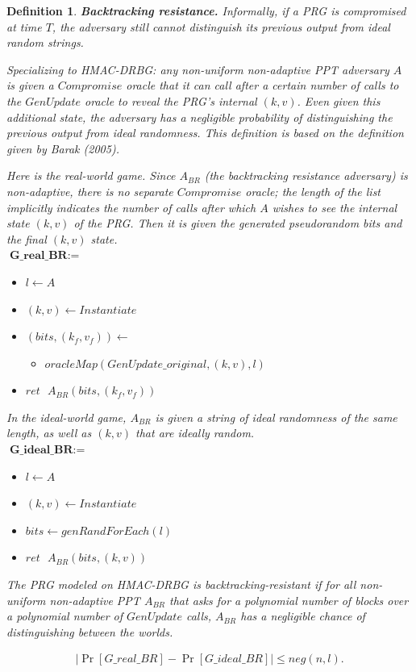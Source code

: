 \documentclass[12pt,lot, lof]{puthesis}
\newenvironment{game}
{ \begin{itemize}[noitemsep,nolistsep] 
}
{ \end{itemize}                  }
\newcommand{\s} {\textrm{ }}
\newcommand{\lar}{\leftarrow}
\newtheorem{dfn}[thm]{Definition}
\begin{document}
\begin{dfn} \textbf{Backtracking resistance.} Informally, if a PRG is compromised at time $T$, the adversary still cannot distinguish its previous output from ideal random strings. 

Specializing to HMAC-DRBG: any non-uniform non-adaptive PPT adversary $A$ is given a $Compromise$ oracle that it can call after a certain number of calls to the $GenUpdate$ oracle to reveal the PRG's internal $(k,v)$. Even given this additional state, the adversary has a negligible probability of distinguishing the previous output from ideal randomness. This definition is based on the definition given by Barak (2005).

Here is the real-world game. Since $A_{BR}$ (the backtracking resistance adversary) is non-adaptive, there is no separate $Compromise$ oracle; the length of the list implicitly indicates the number of calls after which $A$ wishes to see the internal state $(k,v)$ of the PRG. Then it is given the generated pseudorandom bits and the final $(k,v)$ state.\\

$\textbf{G\_real\_BR} := $
\begin{game}
\item[] $l \leftarrow A$
\item[] $(k,v) \leftarrow Instantiate$
\item[] $(bits, (k_f, v_f)) \lar$
  \begin{game}
    \item[] $oracleMap(GenUpdate\_original,(k, v),l)$
  \end{game}
\item[] $ret \s A_{BR}(bits, (k_f, v_f))$ \\
\end{game}

In the ideal-world game, $A_{BR}$ is given a string of ideal randomness of the same length, as well as $(k,v)$ that are ideally random.\\

$\textbf{G\_ideal\_BR} := $
\begin{game}
\item[] $l \leftarrow A$ 
\item[] $(k,v) \leftarrow Instantiate$
\item[] $bits \leftarrow genRandForEach(l)$
\item[] $ret \s A_{BR}(bits, (k,v))$ \\
\end{game}

The PRG modeled on HMAC-DRBG is backtracking-resistant if for all non-uniform non-adaptive PPT $A_{BR}$ that asks for a polynomial number of blocks over a polynomial number of $GenUpdate$ calls, $A_{BR}$ has a negligible chance of distinguishing between the worlds.

\begin{gather*}
|\Pr[G\_real\_BR] - \Pr[G\_ideal\_BR]| \leq neg(n, l).
\end{gather*}
\end{dfn}
\end{document}
